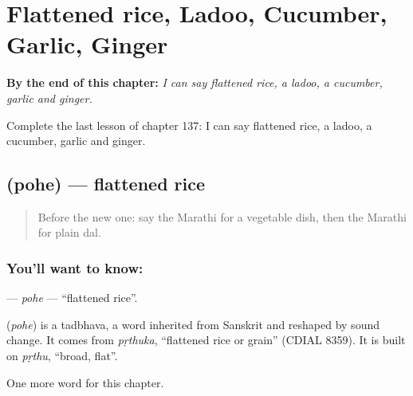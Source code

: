 
\chapter{Flattened rice, Ladoo, Cucumber, Garlic, Ginger}
\label{ch:mr-flattened-rice-ladoo-cucumber-garlic-ginger}

\begin{chapteropening}
\textbf{By the end of this chapter:} \emph{I can say flattened rice, a ladoo, a cucumber, garlic and ginger.}

Complete the last lesson of chapter 137: I can say flattened rice, a ladoo, a cucumber, garlic and ginger.
\end{chapteropening}

\section[\texorpdfstring{\mr{पोहे} (pohe)}{पोहे (pohe)}]{ (pohe) — flattened rice}

\label{lesson:MR-C137-pohe}



\begin{quote}
Before the new one: say the Marathi for a vegetable dish, then the Marathi for plain dal.
\end{quote}

\subsection*{You'll want to know: }
\textbf{} — \emph{pohe} — \textquotedblleft{}flattened rice\textquotedblright{}.

\begin{cousinweb}
\textbf{} (\emph{pohe}) is a tadbhava, a word inherited from Sanskrit and reshaped by sound change. It comes from \emph{pṛthuka}, \textquotedblleft{}flattened rice or grain\textquotedblright{} (CDIAL 8359). It is built on \emph{pṛthu}, \textquotedblleft{}broad, flat\textquotedblright{}.
\end{cousinweb}

\begin{grammarlens}[title={What you've built}]
One more word for this chapter.
\end{grammarlens}

